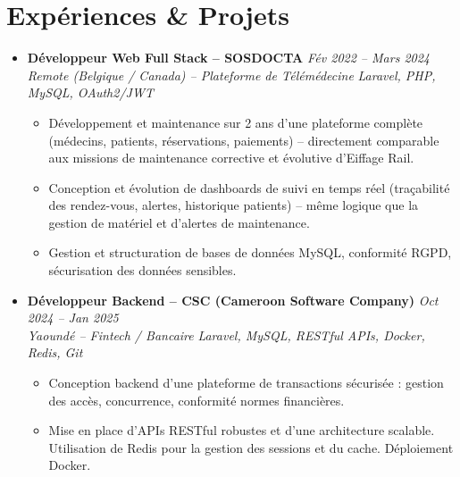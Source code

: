 \documentclass[a4paper,11pt]{article}
\begin{document}
\section{Expériences \& Projets}
\begin{itemize}[leftmargin=*, label={-}]

\item \textbf{Développeur Web Full Stack -- SOSDOCTA} \hfill \textit{Fév 2022 -- Mars 2024} \\
\textit{Remote (Belgique / Canada) -- Plateforme de Télémédecine} \hfill \textit{Laravel, PHP, MySQL, OAuth2/JWT}
\vspace{-2pt}
    \begin{itemize}[leftmargin=0.4cm, nosep, label=\tiny$\bullet$]
        \item \small{Développement et maintenance sur 2 ans d'une plateforme complète (médecins, patients, réservations, paiements) -- directement comparable aux missions de maintenance corrective et évolutive d'Eiffage Rail.}
        \item \small{Conception et évolution de dashboards de suivi en temps réel (traçabilité des rendez-vous, alertes, historique patients) -- même logique que la gestion de matériel et d'alertes de maintenance.}
        \item \small{Gestion et structuration de bases de données MySQL, conformité RGPD, sécurisation des données sensibles.}
    \end{itemize}
\vspace{3pt}

\item \textbf{Développeur Backend -- CSC (Cameroon Software Company)} \hfill \textit{Oct 2024 -- Jan 2025} \\
\textit{Yaoundé -- Fintech / Bancaire} \hfill \textit{Laravel, MySQL, RESTful APIs, Docker, Redis, Git}
\vspace{-2pt}
    \begin{itemize}[leftmargin=0.4cm, nosep, label=\tiny$\bullet$]
        \item \small{Conception backend d'une plateforme de transactions sécurisée : gestion des accès, concurrence, conformité normes financières.}
        \item \small{Mise en place d'APIs RESTful robustes et d'une architecture scalable. Utilisation de Redis pour la gestion des sessions et du cache. Déploiement Docker.}
    \end{itemize}
\vspace{3pt}


\end{itemize}
\end{document}
